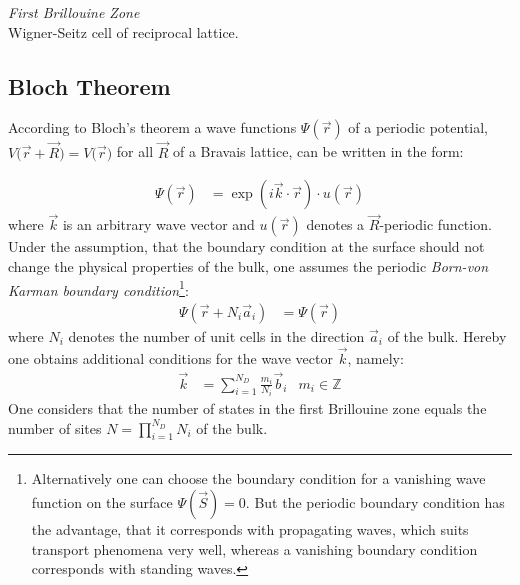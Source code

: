 \emph{First Brillouine Zone}\\
Wigner-Seitz cell of reciprocal lattice.\\

\subsection{Bloch Theorem}
According to Bloch's theorem a wave functions $\Psi(\vec{r})$ of a periodic potential, $V\big(\vec{r} + \vec{R}\big)= V\big(\vec{r}\big)$ for all $\vec{R}$ of a Bravais lattice, can be written in the form:

\begin{align}
	\Psi(\vec{r}) &= \exp\left(i\vec{k}\cdot\vec{r}\right) \cdot u\left(\vec{r}\right)
\end{align}
where $\vec{k}$ is an arbitrary wave vector and $u\left(\vec{r}\right)$ denotes a $\vec{R}$-periodic function.\\
Under the assumption, that the boundary condition at the surface should not change the physical properties of the bulk, one assumes the periodic \emph{Born-von Karman boundary condition}\footnote{Alternatively one can choose the boundary condition  for a vanishing wave function on the surface $\Psi\left(\vec{S}\right) = 0$. But the periodic boundary condition has the advantage, that it corresponds with propagating waves, which suits transport phenomena very well, whereas a vanishing boundary condition corresponds with standing waves.}:
\begin{align}
	\Psi\left(\vec{r} + N_i \vec{a}_i\right) &= \Psi\left(\vec{r}\right)
\end{align}
where $N_i$ denotes the number of unit cells in the direction $\vec{a}_i$ of the bulk. Hereby one obtains additional conditions for the wave vector $\vec{k}$, namely:
\begin{align}
	\vec{k} &= \sum_{i = 1}^{N_D} \frac{m_i}{N_i} \vec{b}_i & m_i \in \mathbb{Z} 
\end{align}
One considers that the number of states in the first Brillouine zone equals the number of sites $N = \prod_{i = 1}^{N_D}N_i$ of the bulk.

